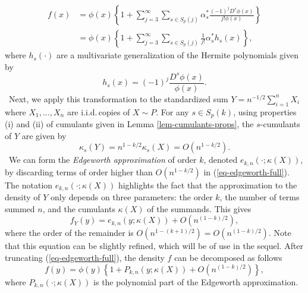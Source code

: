 \begin{align}
    f(x) 
    &= \phi(x) \left\{ 1 + \sum_{j=3}^\infty 
    \sum_{s \in S_p(j)}
    \alpha^*_s \frac{(-1)^j D^s \phi(x)}{j! \phi(x)}\right\} \nonumber \\
    &= \phi(x) \left\{
        1 + \sum_{j=3}^\infty  \sum_{s \in S_p(j)} \frac{1}{j!}\alpha^*_s h_s(x)
    \right\}, \label{eq-edgeworth-full}
\end{align} 
where $h_s(\cdot)$ are a multivariate generalization of the Hermite polynomials given by
\begin{equation*}
    h_s(x) = (-1)^j \frac{D^s \phi(x)}{\phi(x)}.
\end{equation*}
\
Next, we apply this transformation to the standardized sum $Y = n^{-1/2}\sum_{i=1}^n X_i$ where $X_1, \ldots, X_n$ are i.i.d.\,copies of $X \sim P$. For any $s \in S_p(k)$, using properties (i) and (ii) of cumulants given in Lemma \ref{lem-cumulants-props}, the $s$-cumulants of $Y$ are given by 
\begin{equation*}
    \kappa_s(Y) = n^{1-k/2} \kappa_s(X) = O(n^{1-k/2}).
\end{equation*}
\
We can form the \textit{Edgeworth approximation} of order $k$, denoted $e_{k, n}(\cdot; \kappa(X))$, by discarding terms of order higher than $O(n^{1-k/2})$ in (\ref{eq-edgeworth-full}). The notation $e_{k, n}(\cdot; \kappa(X))$ highlights the fact that the approximation to the density of $Y$ only depends on three parameters: the order $k$, the number of terms summed $n$, and the cumulants $\kappa(X)$ of the summands. This gives
\begin{equation} \label{eq-edgeworth}
    f_Y(y) = e_{k, n}(y; \kappa(X)) + O(n^{(1-k)/2}),
\end{equation}
where the order of the remainder is $O(n^{1-(k+1)/2}) = O(n^{(1-k)/2})$. Note that this equation can be slightly refined, which will be of use in the sequel. After truncating (\ref{eq-edgeworth-full}), the density $f$ can be decomposed as follows
\begin{equation} \label{eq-edge-polynomial}
    f(y) = \phi(y)\left\{1 + P_{k, n}(y; \kappa(X)) + O(n^{(1-k)/2})\right\},
\end{equation}
where $P_{k, n}(\cdot; \kappa(X))$ is the polynomial part of the Edgeworth approximation.

